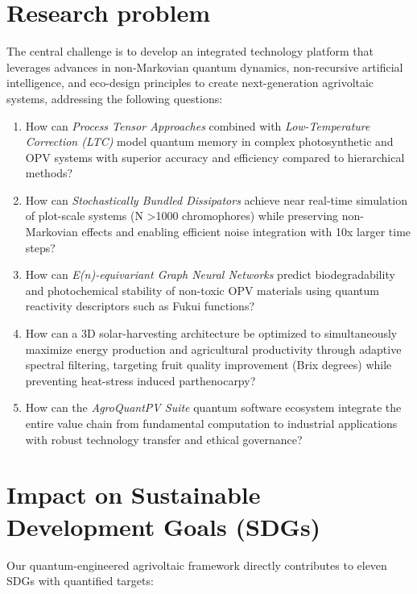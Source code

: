 \documentclass[12pt, a4paper]{article}
\begin{document}
\section{Research problem}
\label{sec:research_problem}

The central challenge is to develop an integrated technology platform that leverages advances in non-Markovian quantum dynamics, non-recursive artificial intelligence, and eco-design principles to create next-generation agrivoltaic systems, addressing the following questions:
\begin{enumerate}
  \item How can \textit{Process Tensor Approaches} combined with \textit{Low-Temperature Correction (LTC)} model quantum memory in complex photosynthetic and OPV systems with superior accuracy and efficiency compared to hierarchical methods?

  \item How can \textit{Stochastically Bundled Dissipators} achieve near real-time simulation of plot-scale systems (N \num{>1000} chromophores) while preserving non-Markovian effects and enabling efficient noise integration with 10x larger time steps?

  \item How can \textit{E(n)-equivariant Graph Neural Networks} predict biodegradability and photochemical stability of non-toxic OPV materials using quantum reactivity descriptors such as Fukui functions?

  \item How can a 3D solar-harvesting architecture be optimized to simultaneously maximize energy production and agricultural productivity through adaptive spectral filtering, targeting fruit quality improvement (Brix degrees) while preventing heat-stress induced parthenocarpy?

  \item How can the \textit{AgroQuantPV Suite} quantum software ecosystem integrate the entire value chain from fundamental computation to industrial applications with robust technology transfer and ethical governance?
\end{enumerate}

\section{Impact on Sustainable Development Goals (SDGs)}
\label{sec:sdg_impact}

Our quantum-engineered agrivoltaic framework directly contributes to eleven SDGs with quantified targets:
\end{document}
